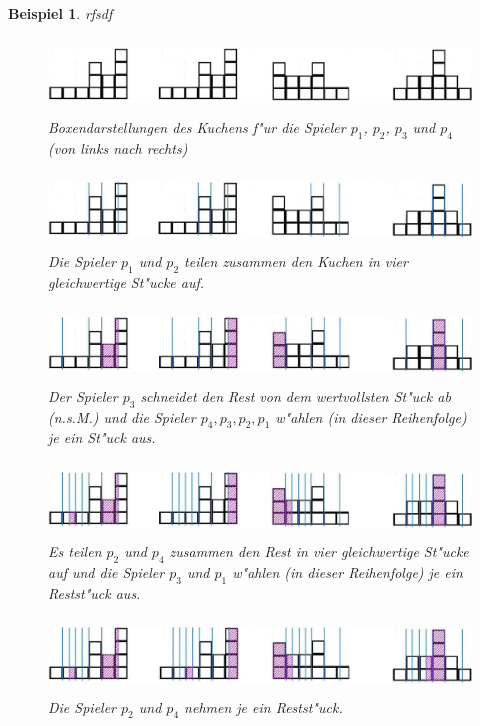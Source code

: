 \documentclass[11pt, a4paper, twoside]{article}
\newcommand{\wf}{\color{white}}
\newtheorem{bsp}[satz]{Beispiel}
\numberwithin{equation}{section}
\begin{document}
\begin{bsp}\wf rfsdf
\begin{figure}[h!]
\includegraphics[height=2cm]{btz1.jpg}
\caption[Beispiel zum Brams,Taylor \& Zwicker Moving-Knife-Protokoll 1/5]{Boxendarstellungen des Kuchens f"ur die Spieler $p_1$, $p_2$, $p_3$ und $p_4$ (von links nach rechts)}
\end{figure}
\begin{figure}[h!]
\includegraphics[height=2cm]{btz3.jpg}
\caption[Beispiel zum Brams,Taylor \& Zwicker Moving-Knife-Protokoll 2/5]{Die Spieler $p_1$ und $p_2$ teilen zusammen den Kuchen in vier gleichwertige St"ucke auf.}
\end{figure}
\begin{figure}[h!]
\includegraphics[height=2cm]{btz6.jpg}
\caption[Beispiel zum Brams,Taylor \& Zwicker Moving-Knife-Protokoll 3/5]{Der Spieler $p_3$ schneidet den Rest von dem wertvollsten St"uck ab (n.s.M.) und die Spieler $p_4,p_3,p_2,p_1$ w"ahlen (in dieser Reihenfolge) je ein St"uck aus.}
\end{figure}
\begin{figure}[h!]
\includegraphics[height=2cm]{btz9.jpg}
\caption[Beispiel zum Brams,Taylor \& Zwicker Moving-Knife-Protokoll 4/5]{Es teilen $p_2$ und $p_4$ zusammen den Rest in vier gleichwertige St"ucke auf und die Spieler $p_3$ und $p_1$ w"ahlen (in dieser Reihenfolge) je ein Restst"uck aus.}
\end{figure}
\begin{figure}[h!]
\includegraphics[height=2cm]{btz8.jpg}
\caption[Beispiel zum Brams,Taylor \& Zwicker Moving-Knife-Protokoll 5/5]{Die Spieler $p_2$ und $p_4$ nehmen je ein Restst"uck.}
\end{figure}
\end{bsp}
\newpage
\end{document}
